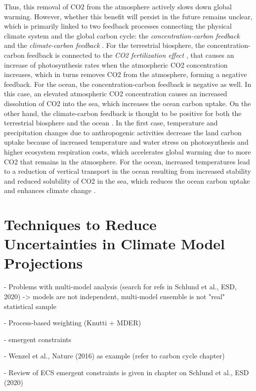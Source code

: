 Thus, this removal of \ac{CO2} from the atmosphere actively slows down global
warming. However, whether this benefit will persist in the future remains
unclear, which is primarily linked to two feedback processes connecting the
physical climate system and the global carbon cycle: the
\emph{concentration-carbon feedback} and the \emph{climate-carbon feedback}
\autocite{Friedlingstein2006, Gregory2009, Collins2013}. For the terrestrial
biosphere, the concentration-carbon feedback is connected to the \emph{\ac{CO2}
  fertilization effect} \autocite{Walker2020}, that causes an increase of
photosynthesis rates when the atmospheric \ac{CO2} concentration increases,
which in turns removes \ac{CO2} from the atmosphere, forming a negative
feedback. For the ocean, the concentration-carbon feedback is negative as well.
In this case, an elevated atmospheric \ac{CO2} concentration causes an
increased dissolution of \ac{CO2} into the sea, which increases the ocean
carbon uptake. On the other hand, the climate-carbon feedback is thought to be
positive for both the terrestrial biosphere and the ocean
\autocite{Gregory2009}. In the first case, temperature and precipitation
changes due to anthropogenic activities decrease the land carbon uptake because
of increased temperature and water stress on photosynthesis and higher
ecosystem respiration costs, which accelerates global warming due to more
\ac{CO2} that remains in the atmosphere. For the ocean, increased temperatures
lead to a reduction of vertical transport in the ocean resulting from increased
stability and reduced solubility of \ac{CO2} in the sea, which reduces the
ocean carbon uptake and enhances climate change \autocite{Gregory2009}.


\section{Techniques to Reduce Uncertainties in Climate Model Projections}
\label{sec:02:techniques}

- Problems with multi-model analysis (search for refs in Schlund et al., ESD,
2020) -> models are not independent, multi-model ensemble is not "real"
statistical sample

- Process-based weighting (Knutti + MDER)

- emergent constraints

- Wenzel et al., Nature (2016) as example (refer to carbon cycle chapter)

- Review of ECS emergent constraints is given in chapter on Schlund et al., ESD
(2020)